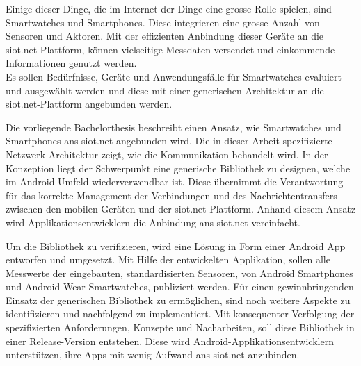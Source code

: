Einige dieser Dinge, die im Internet der Dinge eine grosse Rolle spielen, sind Smartwatches und Smartphones. Diese integrieren eine grosse Anzahl von Sensoren und Aktoren. Mit der effizienten Anbindung dieser Geräte an die siot.net-Plattform, können vielseitige Messdaten versendet und einkommende Informationen genutzt werden.\\
Es sollen Bedürfnisse, Geräte und Anwendungsfälle für Smartwatches evaluiert und ausgewählt werden und diese mit einer generischen Architektur an die siot.net-Plattform angebunden werden.

Die vorliegende Bachelorthesis beschreibt einen Ansatz, wie Smartwatches und Smartphones ans siot.net angebunden wird. Die in dieser Arbeit spezifizierte Netzwerk-Architektur zeigt, wie die Kommunikation behandelt wird. In der Konzeption liegt der Schwerpunkt eine generische Bibliothek zu designen, welche im Android Umfeld wiederverwendbar ist. Diese übernimmt die Verantwortung für das korrekte Management der Verbindungen und des Nachrichtentransfers zwischen den mobilen Geräten und der siot.net-Plattform. Anhand diesem Ansatz wird Applikationsentwicklern die Anbindung ans siot.net vereinfacht.

Um die Bibliothek zu verifizieren, wird eine Lösung in Form einer Android App entworfen und umgesetzt. Mit Hilfe der entwickelten Applikation, sollen alle Messwerte der eingebauten, standardisierten Sensoren, von Android Smartphones und Android Wear Smartwatches, publiziert werden.
Für einen gewinnbringenden Einsatz der generischen Bibliothek zu ermöglichen, sind noch weitere Aspekte zu identifizieren und nachfolgend zu implementiert. Mit konsequenter Verfolgung der spezifizierten Anforderungen, Konzepte und Nacharbeiten, soll diese Bibliothek in einer Release-Version entstehen. Diese wird Android-Applikationsentwicklern unterstützen, ihre Apps mit wenig Aufwand ans siot.net anzubinden.

